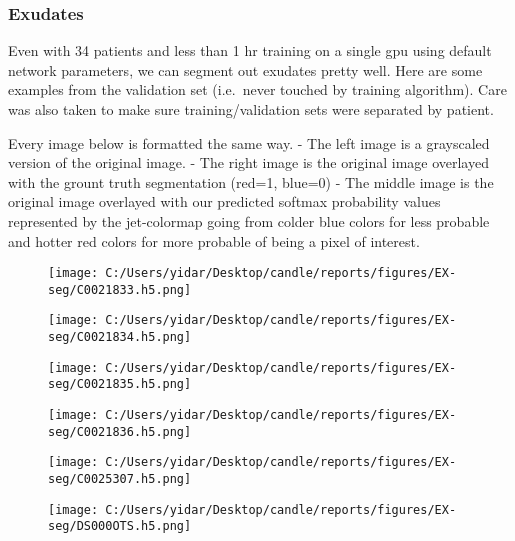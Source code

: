 \documentclass[11pt]{article}
\makeatletter
\def\maxwidth{\ifdim\Gin@nat@width>\linewidth\linewidth
    \else\Gin@nat@width\fi}
\let\Oldincludegraphics\includegraphics
\renewcommand{\includegraphics}[1]{\Oldincludegraphics[width=.8\maxwidth]{#1}}
\makeatother
\begin{document}
    \subsubsection{Exudates}\label{exudates}

Even with 34 patients and less than 1 hr training on a single gpu using
default network parameters, we can segment out exudates pretty well.
Here are some examples from the validation set (i.e.~never touched by
training algorithm). Care was also taken to make sure
training/validation sets were separated by patient.

Every image below is formatted the same way. - The left image is a
grayscaled version of the original image. - The right image is the
original image overlayed with the grount truth segmentation (red=1,
blue=0) - The middle image is the original image overlayed with our
predicted softmax probability values represented by the jet-colormap
going from colder blue colors for less probable and hotter red colors
for more probable of being a pixel of interest.

\begin{figure}
\centering
\texttt{[image: C:/Users/yidar/Desktop/candle/reports/figures/EX-seg/C0021833.h5.png]}
\caption{}
\end{figure}

\begin{figure}
\centering
\texttt{[image: C:/Users/yidar/Desktop/candle/reports/figures/EX-seg/C0021834.h5.png]}
\caption{}
\end{figure}

\begin{figure}
\centering
\texttt{[image: C:/Users/yidar/Desktop/candle/reports/figures/EX-seg/C0021835.h5.png]}
\caption{}
\end{figure}

\begin{figure}
\centering
\texttt{[image: C:/Users/yidar/Desktop/candle/reports/figures/EX-seg/C0021836.h5.png]}
\caption{}
\end{figure}

\begin{figure}
\centering
\texttt{[image: C:/Users/yidar/Desktop/candle/reports/figures/EX-seg/C0025307.h5.png]}
\caption{}
\end{figure}

\begin{figure}
\centering
\texttt{[image: C:/Users/yidar/Desktop/candle/reports/figures/EX-seg/DS000OTS.h5.png]}
\caption{}
\end{figure}
\end{document}
